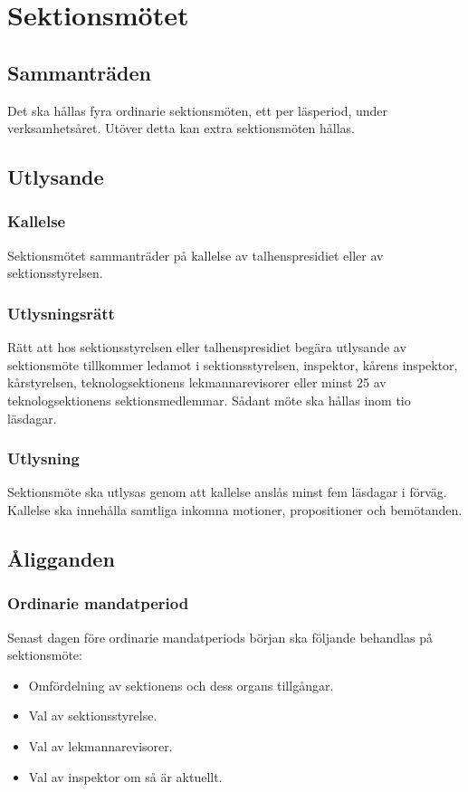 \section{Sektionsmötet}
\subsection{Sammanträden}
Det ska hållas fyra ordinarie sektionsmöten, ett per läsperiod, under verksamhetsåret. Utöver detta kan extra sektionsmöten hållas.
\subsection{Utlysande}
\subsubsection{Kallelse}
Sektionsmötet sammanträder på kallelse av talhenspresidiet eller av sektionsstyrelsen.
\subsubsection{Utlysningsrätt}
Rätt att hos sektionsstyrelsen eller talhenspresidiet begära utlysande av sektionsmöte tillkommer ledamot i sektionsstyrelsen, inspektor, kårens inspektor, kårstyrelsen, teknologsektionens lekmannarevisorer eller minst 25 av teknologsektionens sektionsmedlemmar. Sådant möte ska hållas inom tio läsdagar.
\subsubsection{Utlysning}
\label{sec:sektionsmote_utlysande}
Sektionsmöte ska utlysas genom att kallelse anslås minst fem läsdagar i förväg.
Kallelse ska innehålla samtliga inkomna motioner, propositioner och bemötanden.
\subsection{Åligganden}
\subsubsection{Ordinarie mandatperiod}
Senast dagen före ordinarie mandatperiods början ska följande behandlas på sektionsmöte:
\begin{itemize}
\item Omfördelning av sektionens och dess organs tillgångar.
\item Val av sektionsstyrelse.
\item Val av lekmannarevisorer.
\item Val av inspektor om så är aktuellt.
\end{itemize}
